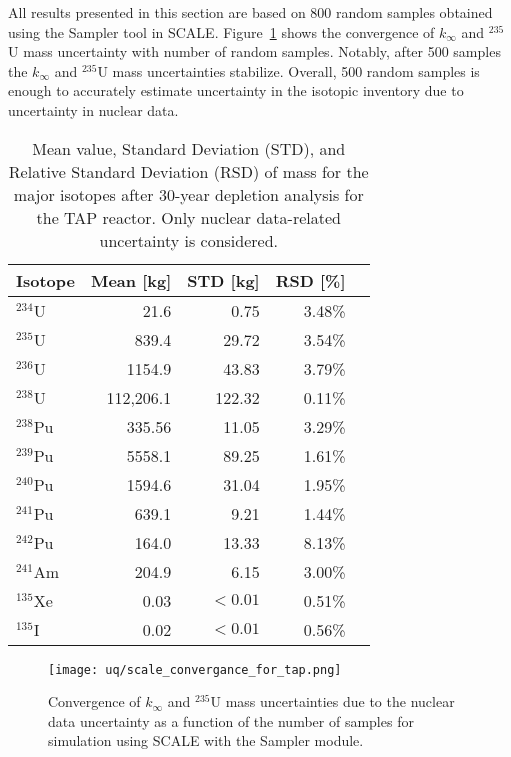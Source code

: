All results presented in this section are based on 800 random samples obtained 
using the Sampler tool in SCALE. Figure~\ref{fig:uq-scale-convergence} 
shows the convergence of $k_{\infty}$ and $^{235}$U mass uncertainty with 
number of random samples. Notably, after 500 samples the $k_{\infty}$ and 
$^{235}$U mass uncertainties stabilize. Overall, 500 random samples is 
enough to accurately estimate uncertainty in the isotopic inventory due to 
uncertainty in nuclear data. 

\begin{table}[hbp!]
	\centering
	\caption{Mean value, Standard Deviation (STD), and Relative Standard 
		Deviation (RSD) of mass for the major isotopes after 30-year depletion 
		analysis for the \gls{TAP} reactor. Only nuclear data-related 
		uncertainty is considered.}
	\begin{tabularx}{0.7\textwidth}{L R R R R}
		\hline
		\textbf{Isotope}  & \textbf{Mean [kg]} & \textbf{STD [kg]} & 
		\textbf{RSD [\%]}\\ \hline
		$^{234}$U  & 21.6  & 0.75  & 3.48\% \\
		$^{235}$U  & 839.4 & 29.72 & 3.54\% \\
		$^{236}$U  & 1154.9& 43.83 & 3.79\% \\
		$^{238}$U  & 112,206.1 & 122.32 & 0.11\% \\
		$^{238}$Pu & 335.56& 11.05 & 3.29\% \\
		$^{239}$Pu & 5558.1& 89.25 & 1.61\% \\
		$^{240}$Pu & 1594.6& 31.04 & 1.95\% \\
		$^{241}$Pu & 639.1 & 9.21  & 1.44\% \\
		$^{242}$Pu & 164.0 & 13.33 & 8.13\% \\
		$^{241}$Am & 204.9 & 6.15  & 3.00\% \\
		$^{135}$Xe & 0.03  &$<0.01$& 0.51\% \\
		$^{135}$I  & 0.02  &$<0.01$& 0.56\% \\ \hline
	\end{tabularx}
	\label{tab:uq-scale-mean-std-rsd}
	\vspace{-0.9em}
\end{table}


\begin{figure}[hbp!] %
	\centering
	\texttt{[image: uq/scale\_convergance\_for\_tap.png]}
	\caption{Convergence of $k_{\infty}$ and $^{235}$U mass uncertainties due 
		to the nuclear data uncertainty as a function of the number of samples 
		for 
		simulation using SCALE with the Sampler module.}
	\label{fig:uq-scale-convergence}
\end{figure}

